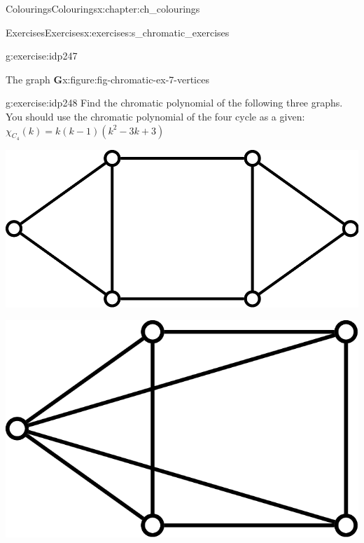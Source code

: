 \documentclass[oneside,10pt,]{book}
\numberwithin{equation}{section}
\newcommand{\bfG}{\mathbf{G}}
\begin{document}
\begin{chapterptx}{Colourings}{}{Colourings}{}{}{x:chapter:ch_colourings}
\begin{exercises-section}{Exercises}{}{Exercises}{}{}{x:exercises:s_chromatic_exercises}
\begin{divisionexercise}{4}{}{}{g:exercise:idp247}
\begin{figureptx}{The graph \(\bfG\)}{x:figure:fig-chromatic-ex-7-vertices}{}
\begin{image}{0.15}{0.7}{0.15}
{
}%
\end{image}%
\tcblower
\end{figureptx}%
%
\end{divisionexercise}%
\begin{divisionexercise}{5}{}{}{g:exercise:idp248}%
Find the chromatic polynomial of the following three graphs. You should use the chromatic polynomial of the four cycle as a given: \(\chi_{C_4}(k)=k(k-1)(k^2-3k+3)\)%
\begin{image}{0}{1}{0}%
\includegraphics[width=\linewidth]{images/ChromPolyProbA.png}
\end{image}%
\begin{image}{0}{1}{0}%
\includegraphics[width=\linewidth]{images/ChromPolyProbB.png}
\end{image}%
\begin{image}{0}{1}{0}%

\end{image}
\end{divisionexercise}
\end{exercises-section}
\end{chapterptx}
\end{document}

